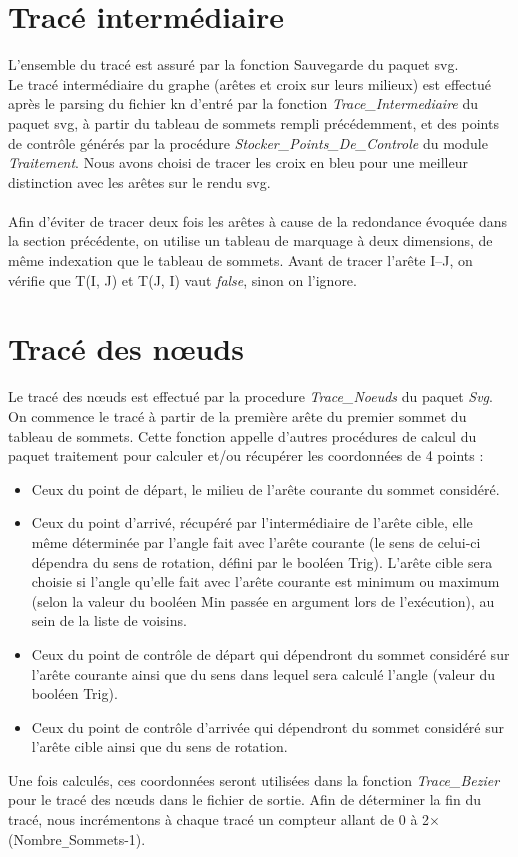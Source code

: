 \documentclass[12pt]{article}
\begin{document}
\section {Tracé intermédiaire}
L'ensemble du tracé est assuré par la fonction Sauvegarde du paquet svg.
\\
Le tracé intermédiaire du graphe (arêtes et croix sur leurs milieux) est effectué après le parsing du fichier kn d'entré par la fonction
\emph{Trace\_Intermediaire} du paquet svg, à partir du tableau de
sommets rempli précédemment, et des points de contrôle générés par la
procédure \emph{Stocker\_Points\_De\_Controle} du module
\emph{Traitement}. 
Nous avons choisi de tracer les croix en bleu pour une meilleur
distinction avec les arêtes sur le rendu svg.\\
\\
Afin d'éviter de tracer deux fois les arêtes à cause de la redondance
évoquée dans la section précédente, on utilise un tableau de marquage à deux
dimensions, de même indexation que le tableau de sommets. Avant de
tracer l'arête I--J, on vérifie que T(I, J) et T(J, I) vaut \emph{false},
sinon on l'ignore.
\section {Tracé des nœuds}
Le tracé des nœuds est effectué par la procedure \emph{Trace\_Noeuds} du
paquet \emph{Svg}. On commence le tracé à partir de la première arête du premier sommet du tableau de sommets. Cette fonction appelle d'autres procédures de calcul du paquet traitement pour calculer et/ou récupérer les coordonnées de 4 points :
\begin{itemize}
\item Ceux du point de départ, le milieu de l'arête courante du sommet considéré.
\item Ceux du point d'arrivé, récupéré par l'intermédiaire de l'arête
  cible, elle même déterminée par l'angle fait avec l'arête courante
  (le sens de celui-ci dépendra du sens de rotation, défini par le
  booléen Trig). L'arête cible sera choisie si l'angle qu'elle fait
  avec l'arête courante est minimum ou maximum (selon la valeur du
  booléen Min passée en argument lors de l'exécution), au sein de la
  liste de voisins.
\item Ceux du point de contrôle de départ qui dépendront du sommet considéré sur l'arête courante ainsi que du sens dans lequel sera calculé l'angle (valeur du booléen Trig).
\item Ceux du point de contrôle d'arrivée qui dépendront du sommet considéré sur l'arête cible ainsi que du sens de rotation.
\end{itemize}
Une fois calculés, ces coordonnées seront utilisées dans la fonction
\emph{Trace\_Bezier} pour le tracé des nœuds dans le fichier de sortie. 
Afin de déterminer la fin du tracé, nous incrémentons à chaque tracé un
compteur allant de 0 à 2$\times$(Nombre\verb+_+Sommets-1). 
\end{document}
